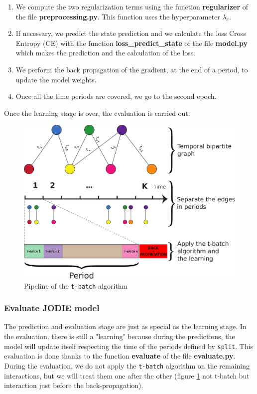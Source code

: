 \begin{enumerate}
    \item We compute the two regularization terms using the function \textbf{regularizer} of the file \textbf{preprocessing.py}. This function uses the hyperparameter $\lambda_e$.
    \item If necessary, we predict the state prediction and we calculate the loss Cross Entropy (CE) with the function \textbf{loss\_predict\_state} of the file \textbf{model.py} which makes the prediction and the calculation of the loss.
    \item We perform the back propagation of the gradient, at the end of a period, to update the model weights.
    \item Once all the time periods are covered, we go to the second epoch.
\end{enumerate}
Once the learning stage is over, the evaluation is carried out.

\begin{figure}[htbp]
    \centering
    \includegraphics[width=.7\textwidth]{image/pipeline_t-batch.pdf}
    \caption{Pipeline of the \texttt{t-batch} algorithm}
    \label{pipeline_t-batch}
\end{figure}

\subsubsection{Evaluate JODIE model}

The prediction and evaluation stage are just as special as the learning stage. In the evaluation, there is still a "learning" because during the predictions, the model will update itself respecting the time of the periods defined by \texttt{split}. This evaluation is done thanks to the function \textbf{evaluate} of the file \textbf{evaluate.py}. During the evaluation, we do not apply the \texttt{t-batch} algorithm on the remaining interactions, but we will treat them one after the other (figure \ref{pipeline_t-batch} not t-batch but interaction just before the back-propagation).

